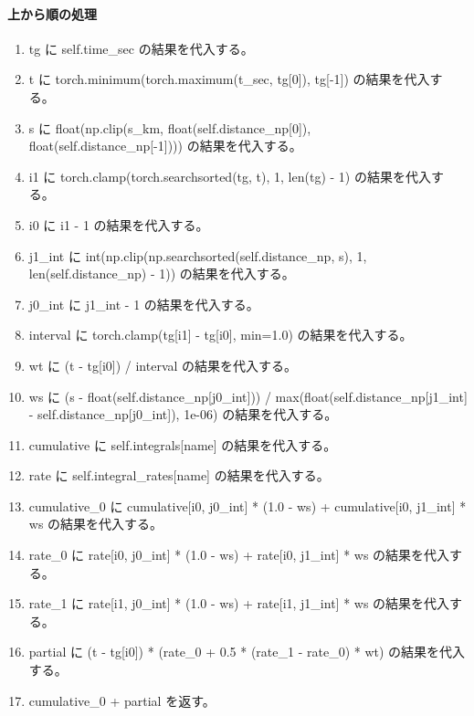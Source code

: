 \documentclass[a4paper,11pt]{article}
\begin{document}
            \paragraph{上から順の処理}
            \begin{enumerate}[leftmargin=1.8em]
            \item tg に self.time\_sec の結果を代入する。
\item t に torch.minimum(torch.maximum(t\_sec, tg[0]), tg[-1]) の結果を代入する。
\item s に float(np.clip(s\_km, float(self.distance\_np[0]), float(self.distance\_np[-1]))) の結果を代入する。
\item i1 に torch.clamp(torch.searchsorted(tg, t), 1, len(tg) - 1) の結果を代入する。
\item i0 に i1 - 1 の結果を代入する。
\item j1\_int に int(np.clip(np.searchsorted(self.distance\_np, s), 1, len(self.distance\_np) - 1)) の結果を代入する。
\item j0\_int に j1\_int - 1 の結果を代入する。
\item interval に torch.clamp(tg[i1] - tg[i0], min=1.0) の結果を代入する。
\item wt に (t - tg[i0]) / interval の結果を代入する。
\item ws に (s - float(self.distance\_np[j0\_int])) / max(float(self.distance\_np[j1\_int] - self.distance\_np[j0\_int]), 1e-06) の結果を代入する。
\item cumulative に self.integrals[name] の結果を代入する。
\item rate に self.integral\_rates[name] の結果を代入する。
\item cumulative\_0 に cumulative[i0, j0\_int] * (1.0 - ws) + cumulative[i0, j1\_int] * ws の結果を代入する。
\item rate\_0 に rate[i0, j0\_int] * (1.0 - ws) + rate[i0, j1\_int] * ws の結果を代入する。
\item rate\_1 に rate[i1, j0\_int] * (1.0 - ws) + rate[i1, j1\_int] * ws の結果を代入する。
\item partial に (t - tg[i0]) * (rate\_0 + 0.5 * (rate\_1 - rate\_0) * wt) の結果を代入する。
\item cumulative\_0 + partial を返す。
            \end{enumerate}
\end{document}
